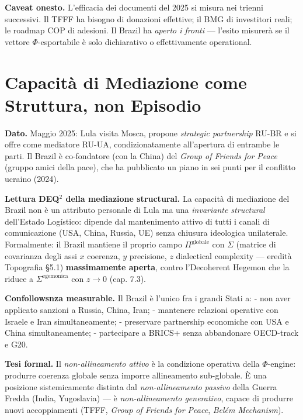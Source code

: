 \Conj{} \textbf{Caveat onesto.} L'efficacia dei documenti del 2025 si
misura nei trienni successivi. Il TFFF ha bisogno di donazioni
effettive; il BMG di investitori reali; le roadmap COP di adesioni. Il
Brazil ha \emph{aperto i fronti} --- l'esito misurerà se il vettore
\(\Phi\)-esportabile è solo dichiarativo o effettivamente operational.



\section{Capacità di Mediazione come Struttura, non
Episodio}\label{capacituxe0-di-mediazione-come-struttura-non-episodio}

\Proved{} \textbf{Dato.} Maggio 2025: Lula visita Mosca, propone
\emph{strategic partnership} RU-BR e si offre come mediatore RU-UA,
condizionatamente all'apertura di entrambe le parti. Il Brazil è
co-fondatore (con la China) del \emph{Group of Friends for Peace} (gruppo
amici della pace), che ha pubblicato un piano in sei punti per il
conflitto ucraino (2024).

\Hypoth{} \textbf{Lettura DEQ$^2$ della mediazione structural.} La
capacità di mediazione del Brazil non è un attributo personale di Lula
ma una \emph{invariante structural} dell'Estado Logístico: dipende dal
mantenimento attivo di tutti i canali di comunicazione (USA, China,
Russia, UE) senza chiusura ideologica unilaterale. Formalmente: il
Brazil mantiene il proprio campo \(\Pi^{\text{globale}}\) con
\(\Sigma\) (matrice di covarianza degli assi \(x\) coerenza, \(y\)
precisione, \(z\) dialectical complexity --- eredità Topografia \S{}5.1)
\textbf{massimamente aperta}, contro l'Decoherent Hegemon che la riduce
a \(\Sigma^{\text{egemonica}}\) con \(z \to 0\) (cap. 7.3).

\Proved{} \textbf{Confollowsnza measurable.} Il Brazil è l'unico fra i
grandi Stati a: - non aver applicato sanzioni a Russia, China, Iran; -
mantenere relazioni operative con Israele e Iran simultaneamente; -
preservare partnership economiche con USA e China simultaneamente; -
partecipare a BRICS+ senza abbandonare OECD-track e G20.

\Hypoth{} \textbf{Tesi formal.} Il \emph{non-allineamento attivo} è la
condizione operativa della \(\Phi\)-engine: produrre coerenza globale
senza imporre allineamento sub-globale. È una posizione sistemicamente
distinta dal \emph{non-allineamento passivo} della Guerra Fredda (India,
Yugoslavia) --- è \emph{non-allineamento generativo}, capace di produrre
nuovi accoppiamenti (TFFF, \emph{Group of Friends for Peace},
\emph{Belém Mechanism}).




